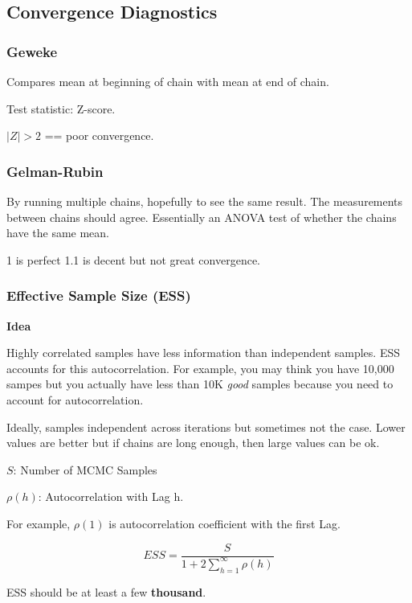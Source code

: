 \documentclass[11pt]{article}
\begin{document}
\subsection{Convergence Diagnostics}
\label{sec:org08c0307}

\subsubsection{Geweke}
\label{sec:orgc4dabde}

Compares mean at beginning of chain with mean at end of chain.

Test statistic: Z-score.

\(|Z| > 2\) == poor convergence.

\subsubsection{Gelman-Rubin}
\label{sec:orge35374b}

By running multiple chains, hopefully to see the same result. The measurements
between chains should agree. Essentially an ANOVA test of whether the chains
have the same mean.

1 is perfect
1.1 is decent but not great convergence.

\subsubsection{Effective Sample Size (ESS)}
\label{sec:org652e806}

\textbf{Idea}

Highly correlated samples have less information than independent samples. ESS
accounts for this autocorrelation. For example, you may think you have 10,000
sampes but you actually have less than 10K \emph{good} samples because you need to
account for autocorrelation.


Ideally, samples independent across iterations but sometimes not the case. Lower
values are better but if chains are long enough, then large values can be ok.

\(S\): Number of MCMC Samples

\(\rho(h)\): Autocorrelation with Lag h.

For example, \(\rho(1)\) is autocorrelation coefficient with the first Lag.

$$
ESS = \frac{S}{1 + 2 \sum_{h = 1}^{\infty} \rho (h)}
$$


ESS should be at least a few \textbf{thousand}.
\end{document}
